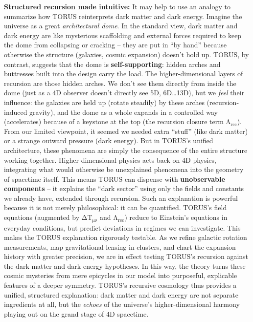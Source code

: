 \documentclass[]{article}
\newcommand{\subscript}[1]{\ensuremath{_{\mathrm{#1}}}}
\begin{document}
\textbf{Structured recursion made intuitive:} It may help to use an
analogy to summarize how TORUS reinterprets dark matter and dark energy.
Imagine the universe as a great \emph{architectural dome}. In the
standard view, dark matter and dark energy are like mysterious
scaffolding and external forces required to keep the dome from
collapsing or cracking -- they are put in ``by hand'' because otherwise
the structure (galaxies, cosmic expansion) doesn't hold up. TORUS, by
contrast, suggests that the dome is \textbf{self-supporting}: hidden
arches and buttresses built into the design carry the load. The
higher-dimensional layers of recursion are those hidden arches. We don't
see them directly from inside the dome (just as a 4D observer doesn't
directly see 5D, 6D\ldots{}13D), but we \emph{feel} their influence: the
galaxies are held up (rotate steadily) by these arches
(recursion-induced gravity), and the dome as a whole expands in a
controlled way (accelerates) because of a keystone at the top (the
recursion closure term
Λ\subscript{rec}). From
our limited viewpoint, it seemed we needed extra ``stuff'' (like dark
matter) or a strange outward pressure (dark energy). But in TORUS's
unified architecture, these phenomena are simply the consequence of the
entire structure working together. Higher-dimensional physics acts back
on 4D physics, integrating what would otherwise be unexplained phenomena
into the geometry of spacetime itself​. This means TORUS can dispense
with \textbf{unobservable components} -- it explains the ``dark sector''
using only the fields and constants we already have, extended through
recursion. Such an explanation is powerful because it is not merely
philosophical: it can be quantified. TORUS's field equations (augmented
by ΔT\subscript{μν} and
Λ\subscript{rec}) reduce
to Einstein's equations in everyday conditions, but predict deviations
in regimes we can investigate​. This makes the TORUS explanation
rigorously testable. As we refine galactic rotation measurements, map
gravitational lensing in clusters, and chart the expansion history with
greater precision, we are in effect testing TORUS's recursion against
the dark matter and dark energy hypotheses. In this way, the theory
turns these cosmic mysteries from mere epicycles in our model into
purposeful, explicable features of a deeper symmetry. TORUS's recursive
cosmology thus provides a unified, structured explanation: dark matter
and dark energy are not separate ingredients at all, but the
\emph{echoes} of the universe's higher-dimensional harmony playing out
on the grand stage of 4D spacetime.
\end{document}
